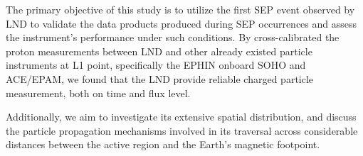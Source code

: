 The primary objective of this study is to utilize the first SEP event observed by LND to validate the data products produced during SEP occurrences and assess the instrument's performance under such conditions. By cross-calibrated the proton measurements between LND and other already existed particle instruments at L1 point, specifically the EPHIN onboard SOHO and ACE/EPAM, we found that the LND provide reliable charged particle measurement, both on time and flux level.

Additionally, we aim to investigate its extensive spatial distribution, and discuss the particle propagation mechanisms involved in its traversal across considerable distances between the active region and the Earth's magnetic footpoint. 

